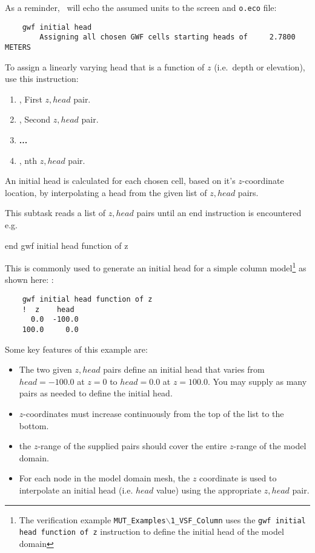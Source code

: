 {As a reminder, \mut\ will echo the assumed units to the screen and \texttt{o.eco} file:
\begin{verbatim}
    gwf initial head
    	Assigning all chosen GWF cells starting heads of     2.7800         METERS

\end{verbatim}


To assign a linearly varying head that is a function of $z$ (i.e.\ depth or elevation), use this instruction:
    {
    \squish
    \begin{enumerate}
    \item {},   First $z, head$ pair.
    \item {},   Second $z, head$ pair.
    \item \textbf{...}
    \item {},   nth $z, head$  pair.
    \end{enumerate}

     An initial head is calculated for each chosen cell, based on it's $z$-coordinate location, by interpolating a head from the given list of  $z, head$ pairs.

     This subtask reads a list of $z, head$ pairs until an \textsf{end} instruction is encountered e.g.\:

    {\Large \sf end gwf initial head function of z}
    }

This is commonly used to generate an initial head for a simple column model\footnote{The verification example \texttt{MUT\_Examples$\backslash$1\_VSF\_Column} uses the \texttt{gwf initial head function of z} instruction to define the initial head of the model domain} as shown here: :
\begin{verbatim}
    gwf initial head function of z
    !  z    head
      0.0  -100.0
    100.0     0.0
\end{verbatim}
Some key features of this example are:
\begin{itemize}
  \item The two given $z,head$ pairs define an initial head  that varies from $head=-100.0$ at $z=0$ to $head=0.0$ at $z=100.0$.  You may supply as many pairs as needed to define the initial head.
  \item $z$-coordinates must increase continuously from the top of the list to the bottom.
  \item the $z$-range of the supplied pairs should cover the entire $z$-range of the model domain.
  \item For each node in the model domain  mesh, the $z$ coordinate is used to interpolate an initial head (i.e. $head$ value) using the appropriate $z, head$ pair.
\end{itemize}

}
